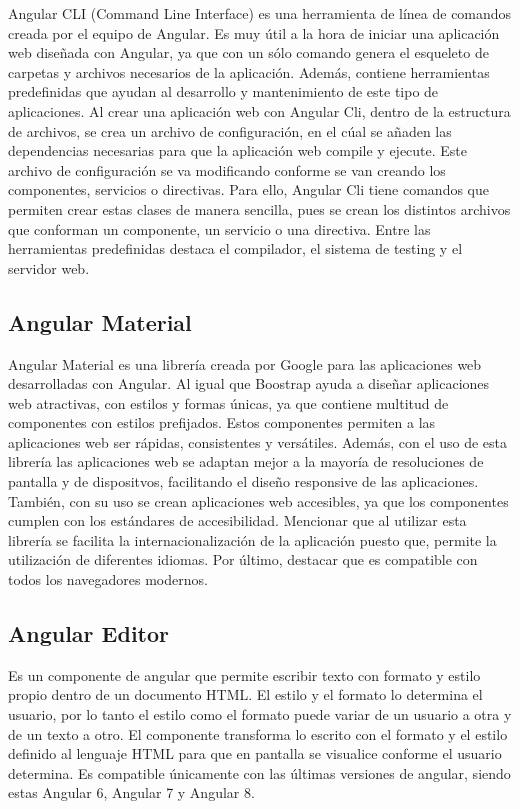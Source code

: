 \documentclass[a4paper, 12pt]{book}
\begin{document}
Angular CLI (Command Line Interface) es una herramienta de línea de comandos creada por el equipo de Angular. Es muy útil a la hora de iniciar una aplicación web diseñada con Angular, ya que con un sólo comando genera el esqueleto de carpetas y archivos necesarios de la aplicación. Además, contiene herramientas predefinidas que ayudan al desarrollo y mantenimiento de este tipo de aplicaciones. Al crear una aplicación web con Angular Cli, dentro de la estructura de archivos, se crea un archivo de configuración, en el cúal se añaden las dependencias necesarias para que la aplicación web compile y ejecute. Este archivo de configuración se va modificando conforme se van creando los componentes, servicios o directivas. Para ello, Angular Cli tiene comandos que permiten crear estas clases de manera sencilla, pues se crean los distintos archivos que conforman un componente, un servicio o una directiva. Entre las herramientas predefinidas destaca el compilador, el sistema de testing y el servidor web. 

\subsection{Angular Material} 
\label{sec:Angular Material}

Angular Material es una librería creada por Google para las aplicaciones web desarrolladas con Angular. Al igual que Boostrap ayuda a diseñar aplicaciones web atractivas, con estilos y formas únicas, ya que contiene multitud de componentes con estilos prefijados. Estos componentes permiten a las aplicaciones web ser rápidas, consistentes y versátiles. Además, con el uso de esta librería las aplicaciones web se adaptan mejor a la mayoría de resoluciones de pantalla y de dispositvos, facilitando el diseño responsive de las aplicaciones. También, con su uso se crean aplicaciones web accesibles, ya que los componentes cumplen con los estándares de accesibilidad. Mencionar que al utilizar esta librería se facilita la internacionalización de la aplicación puesto que, permite la utilización de diferentes idiomas. Por último, destacar que es compatible con todos los navegadores modernos. 

\subsection{Angular Editor} 
\label{sec:Angular Editor}

Es un componente de angular que permite escribir texto con formato y estilo propio dentro de un documento HTML. El estilo y el formato lo determina el usuario, por lo tanto el estilo como el formato puede variar de un usuario a otra y de un texto a otro. El componente transforma lo escrito con el formato y el estilo definido al lenguaje HTML para que en pantalla se visualice conforme el usuario determina. Es compatible únicamente con las últimas versiones de angular, siendo estas Angular 6, Angular 7 y Angular 8. 
\end{document}
